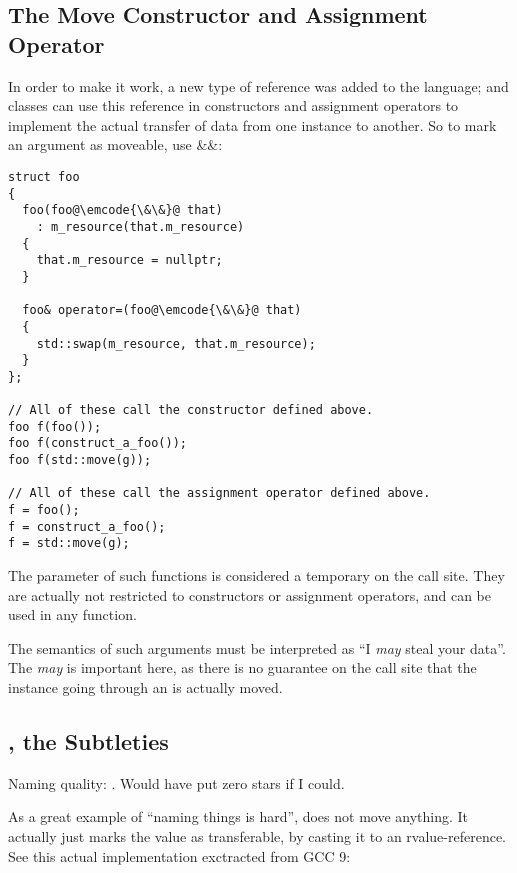 \subsection{The Move Constructor and Assignment Operator}
\label{sec:move-constructor}

In order to make it work, a new type of reference was added to
the language; and classes can use this reference in constructors and
assignment operators to implement the actual transfer of data from one
instance to another. So to mark an argument as moveable, use \&\&:

\begin{lstlisting}
struct foo
{
  foo(foo@\emcode{\&\&}@ that)
    : m_resource(that.m_resource)
  {
    that.m_resource = nullptr;
  }

  foo& operator=(foo@\emcode{\&\&}@ that)
  {
    std::swap(m_resource, that.m_resource);
  }
};

// All of these call the constructor defined above.
foo f(foo());
foo f(construct_a_foo());
foo f(std::move(g));

// All of these call the assignment operator defined above.
f = foo();
f = construct_a_foo();
f = std::move(g);
\end{lstlisting}

The parameter of such functions is considered a temporary on the call
site. They are actually not restricted to constructors or assignment
operators, and can be used in any function.

The semantics of such arguments must be interpreted as ``I {\em may}
steal your data''. The {\em may} is important here, as there is no
guarantee on the call site that the instance going through an
 is actually moved.

\subsection{, the Subtleties}

Naming quality: \faStar\faStarO\faStarO\faStarO\faStarO. Would have
put zero stars if I could.

As a great example of ``naming things is hard'',  does
not move anything. It actually just marks the value as transferable,
by casting it to an rvalue-reference. See this actual implementation
exctracted from GCC 9:

